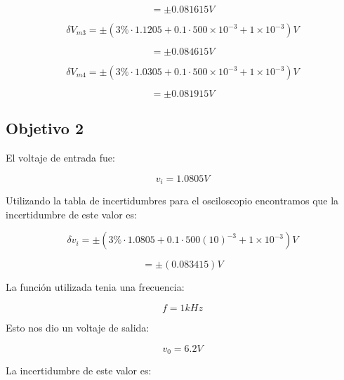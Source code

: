 \documentclass[DIV=calc, paper=a4, fontsize=11pt]{scrartcl}
\begin{document}
\begin{multicols}{2}
\begin{equation*}
    =\pm 0.081615 V
\end{equation*}

\begin{equation*}
    \delta V_{m3}=\pm(3\% \cdot 1.1205 + 0.1 \cdot 500\times10^{-3}+1\times10^{-3} ) V
\end{equation*}

\begin{equation*}
    =\pm 0.084615 V
\end{equation*}

\begin{equation*}
    \delta V_{m4}=\pm(3\% \cdot 1.0305 + 0.1 \cdot 500\times10^{-3}+1\times10^{-3} ) V
\end{equation*}

\begin{equation*}
    =\pm 0.081915 V
\end{equation*}

\subsection*{Objetivo 2}

El voltaje de entrada fue:

\begin{equation*}
    v_{i} = 1.0805 V
\end{equation*}

Utilizando la tabla de incertidumbres para el osciloscopio encontramos que la incertidumbre de este valor es:

\begin{equation*}
    \delta v_{i}=\pm(3\%\cdot 1.0805 + 0.1 \cdot 500 (10)^{-3} + 1\times10^{-3} ) V
\end{equation*}

\begin{equation*}
    =\pm( 0.083415) V
\end{equation*}

La función utilizada tenia una frecuencia:

\begin{equation*}
    f= 1kHz
\end{equation*}

Esto nos dio un voltaje de salida:

\begin{equation*}
    v_{0} = 6.2 V
\end{equation*}

La incertidumbre de este valor es:


\end{multicols}
\end{document}
